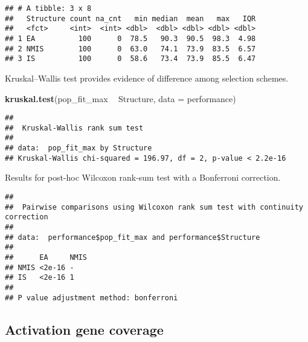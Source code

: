 \documentclass[]{book}
\newenvironment{Shaded}{\begin{snugshade}}{\end{snugshade}}
\newcommand{\DataTypeTok}[1]{\textcolor[rgb]{0.13,0.29,0.53}{#1}}
\newcommand{\KeywordTok}[1]{\textcolor[rgb]{0.13,0.29,0.53}{\textbf{#1}}}
\newcommand{\NormalTok}[1]{#1}
\newcommand{\OperatorTok}[1]{\textcolor[rgb]{0.81,0.36,0.00}{\textbf{#1}}}
\newcommand{\OtherTok}[1]{\textcolor[rgb]{0.56,0.35,0.01}{#1}}
\newcommand{\StringTok}[1]{\textcolor[rgb]{0.31,0.60,0.02}{#1}}
\begin{document}
\begin{verbatim}
## # A tibble: 3 x 8
##   Structure count na_cnt   min median  mean   max   IQR
##   <fct>     <int>  <int> <dbl>  <dbl> <dbl> <dbl> <dbl>
## 1 EA          100      0  78.5   90.3  90.5  98.3  4.98
## 2 NMIS        100      0  63.0   74.1  73.9  83.5  6.57
## 3 IS          100      0  58.6   73.4  73.9  85.5  6.47
\end{verbatim}

Kruskal--Wallis test provides evidence of difference among selection schemes.

\begin{Shaded}
\begin{Highlighting}[]
\KeywordTok{kruskal.test}\NormalTok{(pop_fit_max }\OperatorTok{~}\StringTok{ }\NormalTok{Structure, }\DataTypeTok{data =}\NormalTok{ performance)}
\end{Highlighting}
\end{Shaded}

\begin{verbatim}
## 
##  Kruskal-Wallis rank sum test
## 
## data:  pop_fit_max by Structure
## Kruskal-Wallis chi-squared = 196.97, df = 2, p-value < 2.2e-16
\end{verbatim}

Results for post-hoc Wilcoxon rank-sum test with a Bonferroni correction.

\begin{Shaded}
\end{Shaded}

\begin{verbatim}
## 
##  Pairwise comparisons using Wilcoxon rank sum test with continuity correction 
## 
## data:  performance$pop_fit_max and performance$Structure 
## 
##      EA     NMIS
## NMIS <2e-16 -   
## IS   <2e-16 1   
## 
## P value adjustment method: bonferroni
\end{verbatim}

\hypertarget{activation-gene-coverage-17}{%
\subsection{Activation gene coverage}\label{activation-gene-coverage-17}}
\end{document}
